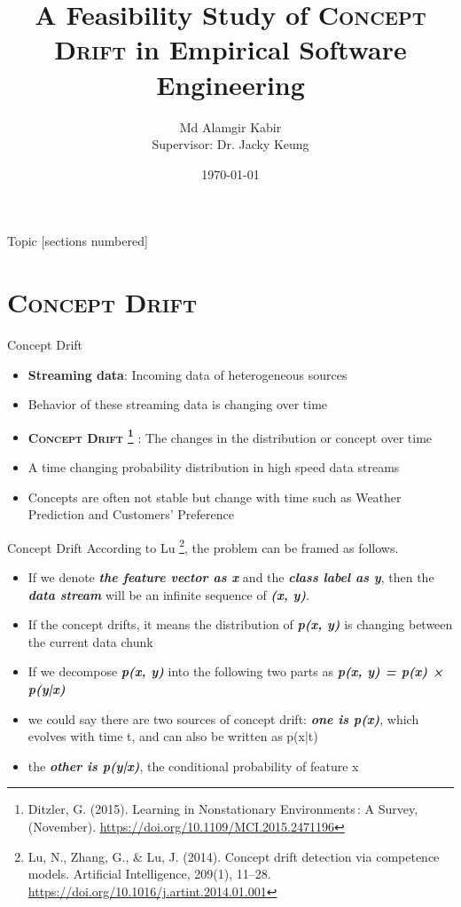 \documentclass[10pt]{beamer}
\title{A Feasibility Study of \textsc{Concept Drift} in Empirical Software Engineering}
\date{\today}
\author{Md Alamgir Kabir \\ Supervisor: Dr. Jacky Keung}
\institute{Department of Computer Science}
\begin{document}
\maketitle

\begin{frame}{Topic}
  [sections numbered]
  \tableofcontents[hideallsubsections]
\end{frame}


\section{\textsc{Concept Drift}}

\begin{frame}{Concept Drift}
\begin{itemize}
  \item \textbf{Streaming data}: Incoming data of heterogeneous sources
  \item Behavior of these streaming data is changing over time
  \item \textsc{\textbf{Concept Drift  \footnote{Ditzler, G. (2015). Learning in Nonstationary Environments : A Survey, (November). \url{https://doi.org/10.1109/MCI.2015.2471196} } }:} The changes in the distribution or concept over time 
  \item A time changing probability distribution in high speed data streams
  \item Concepts are often not stable but change with time such as Weather Prediction and Customers’ Preference
\end{itemize}
\end{frame}

\begin{frame}{Concept Drift}
According to Lu \footnote{Lu, N., Zhang, G., \& Lu, J. (2014). Concept drift detection via competence models. Artificial Intelligence, 209(1), 11–28. \url{https://doi.org/10.1016/j.artint.2014.01.001}}, the problem can be framed as follows.
\begin{itemize}
    \item If we denote \textit{\textbf{the feature vector as x}} and the \textit{\textbf{class label as y}}, then the \textbf{\textit{data stream}} will be an infinite sequence of \textit{\textbf{(x, y)}}.
    \item If the concept drifts, it means the distribution of \textit{\textbf{p(x, y)}} is changing between the current data chunk
    \item If we decompose \textbf{\textit{p(x, y)}} into the following two parts as\textbf{ \textit{p(x, y) = p(x) × p(y|x)}}
    \item we could say there are two sources of concept drift: \textbf{\textit{one is p(x)}}, which evolves with time t, and can also be written as p(x|t)
    \item the \textbf{\textit{other is p(y|x)}}, the conditional probability of feature x
\end{itemize}
\end{frame}
\end{document}
